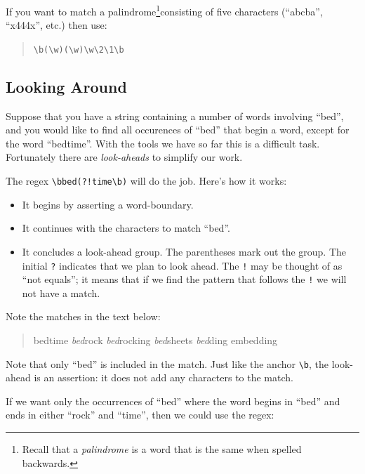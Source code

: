 \documentclass[]{book}
\providecommand{\tightlist}{%
  \setlength{\itemsep}{0pt}\setlength{\parskip}{0pt}}
\let\rmarkdownfootnote\footnote%
\def\footnote{\protect\rmarkdownfootnote}
\theoremstyle{definition}
\theoremstyle{definition}
\theoremstyle{definition}
\theoremstyle{remark}
\begin{document}
{If you want to match a palindrome\footnote{Recall that a
  \emph{palindrome} is a word that is the same when spelled backwards.}consisting
of five characters (``abcba'', ``x444x'', etc.) then use:

\begin{quote}
\texttt{\textbackslash{}b(\textbackslash{}w)(\textbackslash{}w)\textbackslash{}w\textbackslash{}2\textbackslash{}1\textbackslash{}b}
\end{quote}

\subsection{Looking Around}\label{looking-around}

Suppose that you have a string containing a number of words involving
``bed'', and you would like to find all occurences of ``bed'' that begin
a word, except for the word ``bedtime''. With the tools we have so far
this is a difficult task. Fortunately there are \emph{look-aheads}
 to simplify our work.

The regex \texttt{\textbackslash{}bbed(?!time\textbackslash{}b)} will do
the job. Here's how it works:

\begin{itemize}
\tightlist
\item
  It begins by asserting a word-boundary.
\item
  It continues with the characters to match ``bed''.
\item
  It concludes a look-ahead group. The parentheses mark out the group.
  The initial \texttt{?} indicates that we plan to look ahead. The
  \texttt{!} may be thought of as ``not equals''; it means that if we
  find the pattern that follows the \texttt{!} we will not have a match.
\end{itemize}

Note the matches in the text below:

\begin{quote}
bedtime \emph{bed}rock \emph{bed}rocking \emph{bed}sheets \emph{bed}ding
embedding
\end{quote}

Note that only ``bed'' is included in the match. Just like the anchor
\texttt{\textbackslash{}b}, the look-ahead is an assertion: it does not
add any characters to the match.

If we want only the occurrences of ``bed'' where the word begins in
``bed'' and ends in either ``rock'' and ``time'', then we could use the
regex:

}
\end{document}
